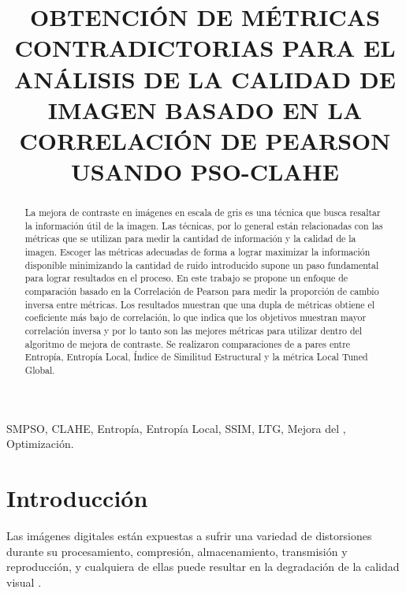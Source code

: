 \documentclass[spanish,twocolumn]{article}
\title{OBTENCIÓN DE MÉTRICAS CONTRADICTORIAS PARA EL ANÁLISIS DE LA CALIDAD DE IMAGEN BASADO EN LA CORRELACIÓN DE PEARSON USANDO PSO-CLAHE}
\begin{document}
%	
\maketitle
%
\begin{abstract}


La mejora de contraste en imágenes en escala de gris es una técnica que busca resaltar la información útil de la imagen. Las técnicas, por lo general están relacionadas con las métricas que se utilizan para medir la cantidad de información y la calidad de la imagen. Escoger las métricas adecuadas de forma a lograr maximizar la información disponible minimizando la cantidad de ruido introducido supone un paso fundamental para lograr resultados en el proceso. En este trabajo se propone un enfoque de comparación basado en la Correlación de Pearson para medir la proporción de cambio inversa entre métricas. Los resultados muestran que una dupla de métricas obtiene el coeficiente más bajo de correlación, lo que indica que los objetivos muestran mayor correlación inversa y por lo tanto son las mejores métricas para utilizar dentro del algoritmo de mejora de contraste. Se realizaron comparaciones de a pares entre Entropía, Entropía Local, Índice de Similitud Estructural y la métrica Local Tuned Global.


\end{abstract}
%
\begin{keywords}
SMPSO, CLAHE, Entropía, Entropía Local, SSIM, LTG, Mejora del , Optimización.
\end{keywords}
%
\section{Introducción}
\label{sec:intro}
Las imágenes digitales están expuestas a sufrir una variedad de distorsiones durante su procesamiento, compresión, almacenamiento, transmisión y reproducción, y cualquiera de ellas puede resultar en la degradación de la calidad visual \cite{digitalimganalysis}.
\end{document}

